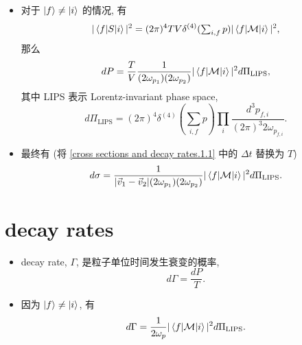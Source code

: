 \begin{itemize}
	\item 对于 $\ket{f} \neq \ket{i}$ 的情况, 有
	\begin{equation}
		|\braket{f | S | i}|^2 = (2 \pi)^4 T V \delta^{(4)}({\textstyle \sum_{i, f} p}) |\braket{f | \mathcal{M} | i}|^2,
	\end{equation}
	那么
	\begin{equation}
		dP = \frac{T}{V} \frac{1}{(2 \omega_{p_1}) (2 \omega_{p_2})} |\braket{f | \mathcal{M} | i}|^2 d\Pi_\text{LIPS},
	\end{equation}
	其中 LIPS 表示 Lorentz-invariant phase space,
	\begin{equation}
		d\Pi_\text{LIPS} = (2 \pi)^4 \delta^{(4)}({\textstyle \sum_{i, f} p}) \prod_i \frac{d^3 p_{f, i}}{(2 \pi)^3 2 \omega_{p_{f, i}}}.
	\end{equation}
	
	\item 最终有 (将 \eqref{cross sections and decay rates.1.1} 中的 $\Delta t$ 替换为 $T$)
	\begin{equation}
		d\sigma = \frac{1}{|\vec{v}_1 - \vec{v}_2| (2 \omega_{p_1}) (2 \omega_{p_2})} |\braket{f | \mathcal{M} | i}|^2 d\Pi_\text{LIPS}.
	\end{equation}
\end{itemize}

\section{decay rates}
\begin{itemize}
	\item decay rate, $\Gamma$, 是粒子单位时间发生衰变的概率,
	\begin{equation}
		d\Gamma = \frac{dP}{T}.
	\end{equation}
	
	\item 因为 $\ket{f} \neq \ket{i}$, 有
	\begin{equation}
		d\Gamma = \frac{1}{2 \omega_p} |\braket{f | \mathcal{M} | i}|^2 d\Pi_\text{LIPS}.
	\end{equation}
\end{itemize}
